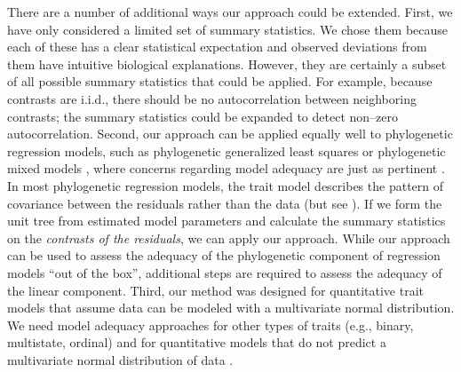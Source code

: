 \documentclass[a4paper,12pt]{article}
\begin{document}
There are a number of additional ways our approach could be extended. First, we have only considered a limited set of summary statistics. We chose them because each of these has a clear statistical expectation and observed deviations from them have intuitive biological explanations. However, they are certainly a subset of all possible summary statistics that could be applied. 
For example, because contrasts are i.i.d., there should be no autocorrelation between neighboring contrasts; the summary statistics could be expanded to detect non--zero autocorrelation. Second, our approach can be applied equally well to phylogenetic regression models, such as phylogenetic generalized least squares \citep{Grafen1989} or phylogenetic mixed models \citep{Lynch1991, Hadfield2010}, where concerns regarding model adequacy are just as pertinent \citep{Hansen2012}. In most phylogenetic regression models, the trait model describes the pattern of covariance between the residuals rather than the data \citep{Rohlf2001, Rohlf2006} (but see \citep{Hansen2008}). If we form the unit tree from estimated model parameters and calculate the summary statistics on the \emph{contrasts of the residuals}, we can apply our approach. While our approach can be used to assess the adequacy of the phylogenetic component of regression models ``out of the box'', additional steps are required to assess the adequacy of the linear component. Third, our method was designed for quantitative trait models that assume data can be modeled with a multivariate normal distribution. We need model adequacy approaches for other types of traits (e.g., binary, multistate, ordinal) and for quantitative models that do not predict a multivariate normal distribution of data \citep{Landis2012}.
\end{document}
